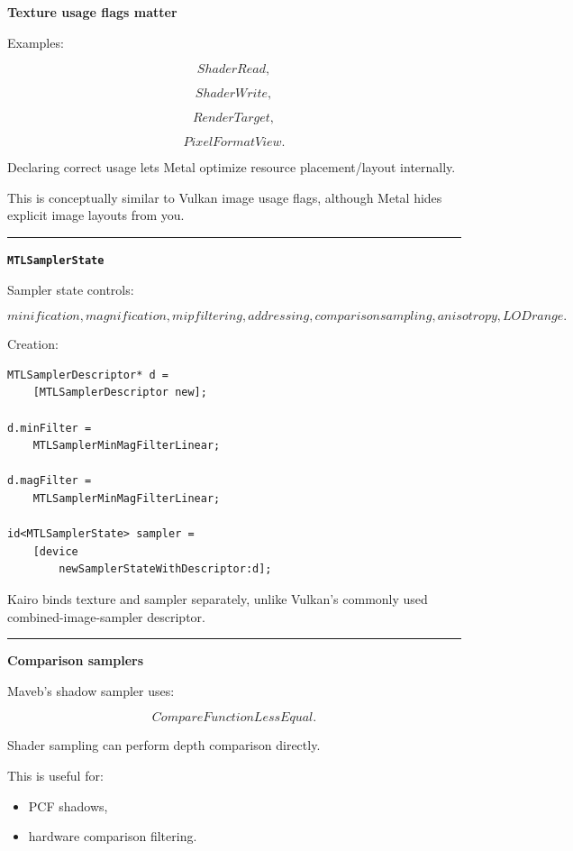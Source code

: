 \textbf{Texture usage flags matter}

Examples:

\[
ShaderRead,
\]

\[
ShaderWrite,
\]

\[
RenderTarget,
\]

\[
PixelFormatView.
\]

Declaring correct usage lets Metal optimize resource placement/layout internally.

This is conceptually similar to Vulkan image usage flags, although Metal hides explicit image layouts from you.

\begin{center}\rule{0.5\linewidth}{0.5pt}\end{center}

\textbf{\texttt{MTLSamplerState}}

Sampler state controls:

\[
minification,
magnification,
mip filtering,
addressing,
comparison sampling,
anisotropy,
LOD range.
\]

Creation:

\begin{verbatim}
MTLSamplerDescriptor* d =
    [MTLSamplerDescriptor new];

d.minFilter =
    MTLSamplerMinMagFilterLinear;

d.magFilter =
    MTLSamplerMinMagFilterLinear;

id<MTLSamplerState> sampler =
    [device
        newSamplerStateWithDescriptor:d];
\end{verbatim}

Kairo binds texture and sampler separately, unlike Vulkan's commonly used combined-image-sampler descriptor.

\begin{center}\rule{0.5\linewidth}{0.5pt}\end{center}

\textbf{Comparison samplers}

Maveb's shadow sampler uses:

\[
CompareFunctionLessEqual.
\]

Shader sampling can perform depth comparison directly.

This is useful for:

\begin{itemize}
\tightlist
\item
  PCF shadows,
\item
  hardware comparison filtering.
\end{itemize}

